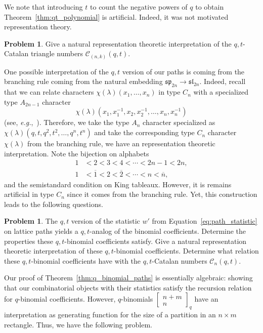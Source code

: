 \documentclass[11pt, leqno]{amsart}
\theoremstyle{plain}
\theoremstyle{definition}
\newtheorem{problem}[theorem]{Problem}
\numberwithin{equation}{section}
\newcommand{\Cat}{\mathcal{C}} %
\newcommand{\qbinom}[3]{\left[ \begin{matrix} #1 \\ #2 \end{matrix} \right]_{#3}} %
\newcommand{\otwo}{\overline{2}}
\newcommand{\one}{\overline{1}}
\newcommand{\on}{\overline{n}}
\begin{document}
We note that introducing $t$ to count the negative powers of $q$ to obtain Theorem~\ref{thm:qt_polynomial} is artificial. Indeed, it was not motivated representation theory.

\begin{problem}
Give a natural representation theoretic interpretation of the $q, t$-Catalan triangle numbers $\Cat_{(n,k)}(q,t)$.
\end{problem}

One possible interpretation of the $q,t$ version of our paths is coming from the branching rule coming from the natural embedding $\mathfrak{sp}_{2n} \to \mathfrak{sl}_{2n}$. Indeed, recall that we can relate characters $\chi(\lambda)(x_1, \dotsc, x_n)$ in type $C_n$ with a specialized type $A_{2n-1}$ character
\[
\chi(\lambda)(x_1, x_1^{-1}, x_2, x_2^{-1}, \dotsc , x_n, x_n^{-1})
\]
(see, \textit{e.g.},~\cite[Lemma~1.5.1]{KT87}). Therefore, we take the type $A_n$ character specialized as $\chi(\lambda)(q, t, q^2, t^2, \dotsc, q^n, t^n)$ and take the corresponding type $C_n$ character $\chi(\lambda)$ from the branching rule, we have an representation theoretic interpretation. Note the bijection on alphabets
\begin{align*}
1 & < 2 < 3 < 4 < \cdots < 2n - 1 < 2n,
\\ 1 & < \one < 2 < \otwo < \cdots < n < \on,
\end{align*}
and the semistandard condition on King tableaux.
However, it is remains artificial in type $C_n$ since it comes from the branching rule. Yet, this construction leads to the following questions.

\begin{problem}
The $q,t$ version of the statistic $w'$ from Equation~\eqref{eq:path_statistic} on lattice paths yields a $q,t$-analog of the binomial coefficients.
Determine the properties these $q,t$-binomial coefficients satisfy.
Give a natural representation theoretic interpretation of these $q,t$-binomial coefficients.
Determine what relation these $q,t$-binomial coefficients have with the $q,t$-Catalan numbers $\Cat_n(q,t)$.
\end{problem}

Our proof of Theorem~\ref{thm:q_binomial_paths} is essentially algebraic: showing that our combinatorial objects with their statistics satisfy the recursion relation for $q$-binomial coefficients. However, $q$-binomials $\qbinom{n+m}{n}{q}$ have an interpretation as generating function for the size of a partition in an $n \times m$ rectangle. Thus, we have the following problem.
\end{document}
